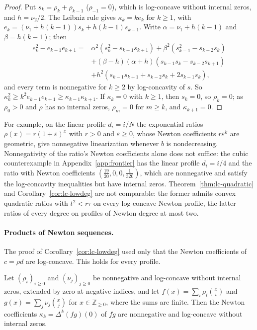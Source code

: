 \begin{proof}
Put $s_k=\rho_k+\rho_{k-1}$ ($\rho_{-1}=0$), which is log-concave without internal zeros, and $h=\nu_2/2$. The Leibniz rule gives $\kappa_k=ke_k$ for $k\geq1$, with $e_k=(\nu_1+h(k-1))s_k+h(k-1)s_{k-1}$. Write $\alpha=\nu_1+h(k-1)$ and $\beta=h(k-1)$; then
\[
\begin{aligned}
e_k^2-e_{k-1}e_{k+1}={}&\alpha^2(s_k^2-s_{k-1}s_{k+1})+\beta^2(s_{k-1}^2-s_{k-2}s_k)\\
&+(\beta-h)(\alpha+h)(s_{k-1}s_k-s_{k-2}s_{k+1})\\
&+h^2(s_{k-1}s_{k+1}+s_{k-2}s_k+2s_{k-1}s_k),
\end{aligned}
\]
and every term is nonnegative for $k\geq2$ by log-concavity of $s$. So $\kappa_k^2\geq k^2e_{k-1}e_{k+1}\geq\kappa_{k-1}\kappa_{k+1}$. If $\kappa_k=0$ with $k\geq1$, then $s_k=0$, so $\rho_k=0$; as $\rho_0>0$ and $\rho$ has no internal zeros, $\rho_m=0$ for $m\geq k$, and $\kappa_{k+1}=0$.
\end{proof}

For example, on the linear profile $d_i=i/N$ the exponential ratios $\rho(x)=r(1+\varepsilon)^x$ with $r>0$ and $\varepsilon\geq0$, whose Newton coefficients $r\varepsilon^k$ are geometric, give nonnegative linearization whenever $b$ is nondecreasing. Nonnegativity of the ratio's Newton coefficients alone does not suffice: the cubic counterexample in Appendix~\ref{app:frontier} has the linear profile $d_i=i/4$ and the ratio with Newton coefficients $(\frac{19}{20},0,0,\frac1{320})$, which are nonnegative and satisfy the log-concavity inequalities but have internal zeros. Theorem~\ref{thm:lc-quadratic} and Corollary~\ref{cor:lc-lowdeg} are not comparable: the former admits convex quadratic ratios with $t^2<r\tau$ on every log-concave Newton profile, the latter ratios of every degree on profiles of Newton degree at most two.

\paragraph{Products of Newton sequences.}
The proof of Corollary~\ref{cor:lc-lowdeg} used only that the Newton coefficients of $c=\rho d$ are log-concave. This holds for every profile.

\begin{proposition}[Products]\label{prop:np}
Let $(\rho_i)_{i\geq0}$ and $(\nu_j)_{j\geq0}$ be nonnegative and log-concave without internal zeros, extended by zero at negative indices, and let $f(x)=\sum_i\rho_i\binom xi$ and $g(x)=\sum_j\nu_j\binom xj$ for $x\in\mathbb Z_{\geq0}$, where the sums are finite. Then the Newton coefficients $\kappa_k=\Delta^k(fg)(0)$ of $fg$ are nonnegative and log-concave without internal zeros.
\end{proposition}

